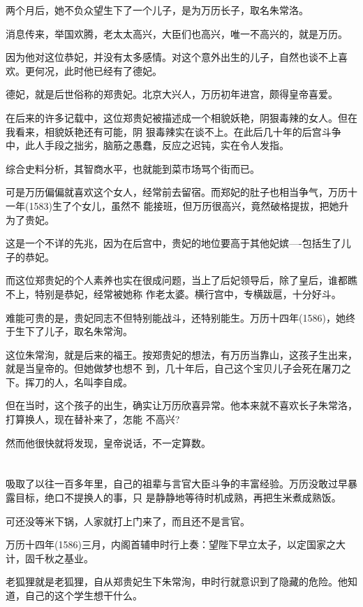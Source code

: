 \documentclass[11pt,a4paper,onecolumn]{article}
\begin{document}
两个月后，她不负众望生下了一个儿子，是为万历长子，取名朱常洛。

消息传来，举国欢腾，老太太高兴，大臣们也高兴，唯一不高兴的，就是万历。

因为他对这位恭妃，并没有太多感情。对这个意外出生的儿子，自然也谈不上喜欢。更何况，此时他已经有了德妃。

德妃，就是后世俗称的郑贵妃。北京大兴人，万历初年进宫，颇得皇帝喜爱。

在后来的许多记载中，这位郑贵妃被描述成一个相貌妖艳，阴狠毒辣的女人。但在我看来，相貌妖艳还有可能，阴
狠毒辣实在谈不上。在此后几十年的后宫斗争中，此人手段之拙劣，脑筋之愚蠢，反应之迟钝，实在令人发指。

综合史料分析，其智商水平，也就能到菜市场骂个街而已。

可是万历偏偏就喜欢这个女人，经常前去留宿。而郑妃的肚子也相当争气，万历十一年(1583)生了个女儿，虽然不
能接班，但万历很高兴，竟然破格提拔，把她升为了贵妃。

这是一个不详的先兆，因为在后宫中，贵妃的地位要高于其他妃嫔----包括生了儿子的恭妃。

而这位郑贵妃的个人素养也实在很成问题，当上了后妃领导后，除了皇后，谁都瞧不上，特别是恭妃，经常被她称
作老太婆。横行宫中，专横跋扈，十分好斗。

难能可贵的是，贵妃同志不但特别能战斗，还特别能生。万历十四年(1586)，她终于生下了儿子，取名朱常洵。

这位朱常洵，就是后来的福王。按郑贵妃的想法，有万历当靠山，这孩子生出来，就是当皇帝的。但她做梦也想不
到，几十年后，自己这个宝贝儿子会死在屠刀之下。挥刀的人，名叫李自成。

但在当时，这个孩子的出生，确实让万历欣喜异常。他本来就不喜欢长子朱常洛，打算换人，现在替补来了，怎能
不高兴?

然而他很快就将发现，皇帝说话，不一定算数。

\section[\thesection]{}

吸取了以往一百多年里，自己的祖辈与言官大臣斗争的丰富经验。万历没敢过早暴露目标，绝口不提换人的事，只
是静静地等待时机成熟，再把生米煮成熟饭。

可还没等米下锅，人家就打上门来了，而且还不是言官。

万历十四年(1586)三月，内阁首辅申时行上奏：望陛下早立太子，以定国家之大计，固千秋之基业。

老狐狸就是老狐狸，自从郑贵妃生下朱常洵，申时行就意识到了隐藏的危险。他知道，自己的这个学生想干什么。
\end{document}
